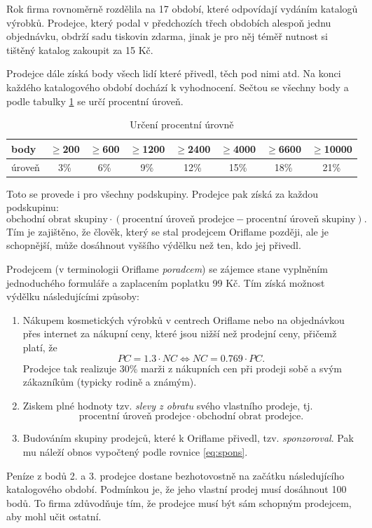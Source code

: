 \documentclass[a4wide,12pt]{report}
\begin{document}
Rok firma rovnoměrně rozdělila na 17 období, které odpovídají vydáním katalogů výrobků. Prodejce, který podal v předchozích třech obdobích alespoň jednu objednávku, obdrží sadu tiskovin zdarma, jinak je pro něj téměř nutnost si tištěný katalog zakoupit za 15 Kč.

Prodejce dále získá body všech lidí které přivedl, těch pod nimi atd. Na konci každého katalogového období dochází k vyhodnocení. Sečtou se všechny body a podle tabulky \ref{tab:perc_level} se určí procentní úroveň.
\begin{table}[htb]
\begin{center}
\begin{tabular}{|l|c|c|c|c|c|c|c|}
\hline
body & $\geq$200 & $\geq$600 & $\geq$1200 & $\geq$2400 & $\geq$4000 & $\geq$6600& $\geq$10000\\\hline
úroveň & 3\% & 6\% & 9\% & 12\% & 15\% & 18\% & 21\%\\\hline
\end{tabular}
\end{center}
\caption{Určení procentní úrovně}
\label{tab:perc_level}
\end{table}
Toto se provede i pro všechny podskupiny. Prodejce pak získá za každou podskupinu:
\begin{equation} \label{eq:spons}
\text{obchodní obrat skupiny} \cdot (\text{procentní úroveň prodejce} - \text{procentní úroveň skupiny}).
\end{equation}
Tím je zajištěno, že člověk, který se stal prodejcem Oriflame později, ale je schopnější, může dosáhnout vyššího výdělku než ten, kdo jej přivedl.

Prodejcem (v terminologii Oriflame \emph{poradcem}) se zájemce stane vyplněním jednoduchého formuláře a zaplacením poplatku 99 Kč. Tím získá možnost výdělku následujícími způsoby:
\begin{enumerate}
\item Nákupem kosmetických výrobků v centrech Oriflame nebo na objednávkou přes internet za nákupní ceny, které jsou nižší než prodejní ceny, přičemž platí, že
\begin{equation} \label{eq:pcnc}
PC=1.3 \cdot NC \Leftrightarrow NC = 0.769 \cdot PC.
\end{equation}
Prodejce tak realizuje 30\% marži z nákupních cen při prodeji sobě a svým zákazníkům (typicky rodině a známým).
\item Ziskem plné hodnoty tzv. \emph{slevy z obratu} svého vlastního prodeje, tj.
\begin{equation} \label{eq:so}
\text{procentní úroveň prodejce} \cdot \text{obchodní obrat prodejce}.
\end{equation}
\item Budováním skupiny prodejců, které k Oriflame přivedl, tzv. \emph{sponzoroval}. Pak mu náleží obnos vypočtený podle rovnice \ref{eq:spons}.
\end{enumerate}
Peníze z bodů 2. a 3. prodejce dostane bezhotovostně na začátku následujícího katalogového období. Podmínkou je, že jeho vlastní prodej musí dosáhnout 100 bodů. To firma zdůvodňuje tím, že prodejce musí být sám schopným prodejcem, aby mohl učit ostatní.
\end{document}

